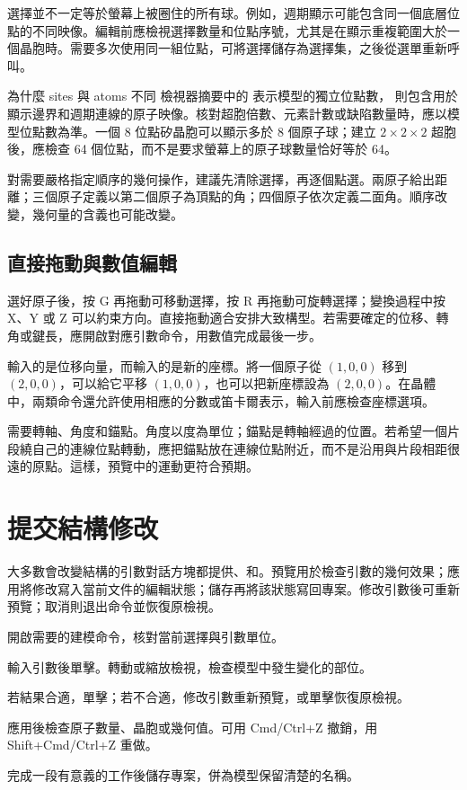 選擇並不一定等於螢幕上被圈住的所有球。例如，週期顯示可能包含同一個底層位點的不同映像。編輯前應檢視選擇數量和位點序號，尤其是在顯示重複範圍大於一個晶胞時。需要多次使用同一組位點，可將選擇儲存為選擇集，之後從選單重新呼叫。

\begin{notebox}{為什麼 sites 與 atoms 不同}
檢視器摘要中的  表示模型的獨立位點數， 則包含用於顯示邊界和週期連線的原子映像。核對超胞倍數、元素計數或缺陷數量時，應以模型位點數為準。一個 8 位點矽晶胞可以顯示多於 8 個原子球；建立 $2\times2\times2$ 超胞後，應檢查 64 個位點，而不是要求螢幕上的原子球數量恰好等於 64。
\end{notebox}



對需要嚴格指定順序的幾何操作，建議先清除選擇，再逐個點選。兩原子給出距離；三個原子定義以第二個原子為頂點的角；四個原子依次定義二面角。順序改變，幾何量的含義也可能改變。

\subsection{直接拖動與數值編輯}

選好原子後，按 G 再拖動可移動選擇，按 R 再拖動可旋轉選擇；變換過程中按 X、Y 或 Z 可以約束方向。直接拖動適合安排大致構型。若需要確定的位移、轉角或鍵長，應開啟對應引數命令，用數值完成最後一步。

輸入的是位移向量，而輸入的是新的座標。將一個原子從 $(1,0,0)$ 移到 $(2,0,0)$，可以給它平移 $(1,0,0)$，也可以把新座標設為 $(2,0,0)$。在晶體中，兩類命令還允許使用相應的分數或笛卡爾表示，輸入前應檢查座標選項。

需要轉軸、角度和錨點。角度以度為單位；錨點是轉軸經過的位置。若希望一個片段繞自己的連線位點轉動，應把錨點放在連線位點附近，而不是沿用與片段相距很遠的原點。這樣，預覽中的運動更符合預期。

\section{提交結構修改}

大多數會改變結構的引數對話方塊都提供、和。預覽用於檢查引數的幾何效果；應用將修改寫入當前文件的編輯狀態；儲存再將該狀態寫回專案。修改引數後可重新預覽；取消則退出命令並恢復原檢視。

\begin{steps}
  \item 開啟需要的建模命令，核對當前選擇與引數單位。
  \item 輸入引數後單擊。轉動或縮放檢視，檢查模型中發生變化的部位。
  \item 若結果合適，單擊；若不合適，修改引數重新預覽，或單擊恢復原檢視。
  \item 應用後檢查原子數量、晶胞或幾何值。可用 Cmd/Ctrl+Z 撤銷，用 Shift+Cmd/Ctrl+Z 重做。
  \item 完成一段有意義的工作後儲存專案，併為模型保留清楚的名稱。
\end{steps}

